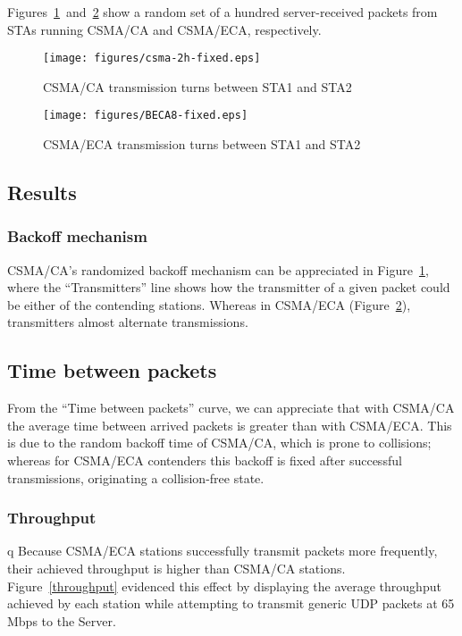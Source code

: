 \documentclass[conference]{IEEEtran}
\begin{document}
Figures~\ref{ca-backoff}~and~\ref{eca-backoff} show a random set of a hundred server-received packets from STAs running CSMA/CA and CSMA/ECA, respectively.

\begin{figure}[htbp]
\centering
  \texttt{[image: figures/csma-2h-fixed.eps]}
  \caption{CSMA/CA transmission turns between STA1 and STA2}
  \label{ca-backoff}
\end{figure}

\begin{figure}[htbp]
\centering
  \texttt{[image: figures/BECA8-fixed.eps]}
  \caption{CSMA/ECA transmission turns between STA1 and STA2}
  \label{eca-backoff}
\end{figure}

\subsection{Results}

\subsubsection*{Backoff mechanism}
CSMA/CA's randomized backoff mechanism can be appreciated in Figure~\ref{ca-backoff}, where the ``Transmitters'' line shows how the transmitter of a given packet could be either of the contending stations. Whereas in CSMA/ECA (Figure~\ref{eca-backoff}), transmitters almost alternate transmissions.

\subsection*{Time between packets}
From the ``Time between packets'' curve, we can appreciate that with CSMA/CA the average time between arrived packets is greater than with CSMA/ECA. This is due to the random backoff time of CSMA/CA, which is prone to collisions; whereas for CSMA/ECA contenders this backoff is fixed after successful transmissions, originating a collision-free state.

\subsubsection*{Throughput}q
Because CSMA/ECA stations successfully transmit packets more frequently, their achieved throughput is higher than CSMA/CA stations. 
Figure~\ref{throughput} evidenced this effect by displaying the average throughput achieved by each station while attempting to transmit generic UDP packets at 65 Mbps to the Server. 
\end{document}
